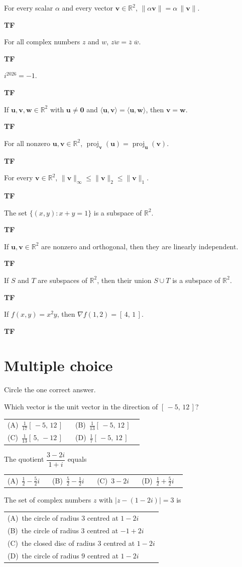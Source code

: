 \documentclass[11pt]{article}
\makeatletter
\newcommand{\tf}[1]{\parbox[t]{\dimexpr\linewidth-5.5em}{#1}%
  \hfill\textsf{\textbf{T}\qquad\textbf{F}}}
\newcommand{\fourch}[4]{\par\smallskip\noindent
  \begin{tabular}{@{}*{4}{>{\raggedright\arraybackslash}p{0.22\linewidth}}@{}}
  (A)\ #1 & (B)\ #2 & (C)\ #3 & (D)\ #4
  \end{tabular}\par}
\newcommand{\twoch}[4]{\par\smallskip\noindent
  \begin{tabular}{@{}*{2}{>{\raggedright\arraybackslash}p{0.46\linewidth}}@{}}
  (A)\ #1 & (B)\ #2 \\[6pt]
  (C)\ #3 & (D)\ #4
  \end{tabular}\par}
\newcommand{\stackch}[4]{\par\smallskip\noindent
  \begin{tabular}{@{}l@{}}
  (A)\ #1 \\[3pt] (B)\ #2 \\[3pt] (C)\ #3 \\[3pt] (D)\ #4
  \end{tabular}\par}
\newcommand{\R}{\mathbb{R}}
\newcommand{\vc}[1]{\mathbf{#1}}
\newcommand{\norm}[1]{\lVert #1\rVert}
\newcommand{\ip}[2]{\langle #1,#2\rangle}
\newcommand{\proj}[2]{\operatorname{proj}_{#1}(#2)}
\newcommand{\conj}[1]{\overline{#1}}
\newcommand{\grad}{\nabla}
\makeatother
\begin{document}
\begin{tfitems}
  \item \tf{For every scalar $\alpha$ and every vector $\vc{v}\in\R^{2}$,
        $\norm{\alpha\vc{v}}=\alpha\,\norm{\vc{v}}$.}
        \vfill
  \item \tf{For all complex numbers $z$ and $w$,
        $\conj{zw}=\conj{z}\;\conj{w}$.}
        \vfill
  \item \tf{$i^{2026}=-1$.}
        \vfill
  \item \tf{If $\vc{u},\vc{v},\vc{w}\in\R^{2}$ with $\vc{u}\neq\vc{0}$ and
        $\ip{\vc{u}}{\vc{v}}=\ip{\vc{u}}{\vc{w}}$, then $\vc{v}=\vc{w}$.}
        \vfill
  \item \tf{For all nonzero $\vc{u},\vc{v}\in\R^{2}$,
        $\proj{\vc{v}}{\vc{u}}=\proj{\vc{u}}{\vc{v}}$.}
        \vfill
\end{tfitems}

\newpage
\begin{tfitems}[start=6]
  \item \tf{For every $\vc{v}\in\R^{2}$,
        $\norm{\vc{v}}_\infty\le\norm{\vc{v}}_2\le\norm{\vc{v}}_1$.}
        \vfill
  \item \tf{The set $\{(x,y) : x+y=1\}$ is a subspace of $\R^{2}$.}
        \vfill
  \item \tf{If $\vc{u},\vc{v}\in\R^{2}$ are nonzero and orthogonal, then they
        are linearly independent.}
        \vfill
  \item \tf{If $S$ and $T$ are subspaces of $\R^{2}$, then their union
        $S\cup T$ is a subspace of $\R^{2}$.}
        \vfill
  \item \tf{If $f(x,y)=x^{2}y$, then $\grad f(1,2)=[\,4,\,1\,]$.}
        \vfill
\end{tfitems}

\newpage
\section{Multiple choice}
Circle the one correct answer.

\begin{tfitems}
  \item Which vector is the unit vector in the direction of
        $[\,-5,\,12\,]$?
        \twoch{$\tfrac{1}{17}[\,-5,\,12\,]$}
              {$\tfrac{1}{13}[\,-5,\,12\,]$}
              {$\tfrac{1}{13}[\,5,\,-12\,]$}
              {$\tfrac{1}{7}[\,-5,\,12\,]$}
        \vfill
  \item The quotient $\dfrac{3-2i}{1+i}$ equals
        \fourch{$\tfrac12-\tfrac52 i$}
               {$\tfrac52-\tfrac12 i$}
               {$3-2i$}
               {$\tfrac12+\tfrac52 i$}
        \vfill
  \item The set of complex numbers $z$ with $\lvert z-(1-2i)\rvert=3$ is
        \stackch{the circle of radius $3$ centred at $1-2i$}
              {the circle of radius $3$ centred at $-1+2i$}
              {the closed disc of radius $3$ centred at $1-2i$}
              {the circle of radius $9$ centred at $1-2i$}
        \vfill
\end{tfitems}
\end{document}
